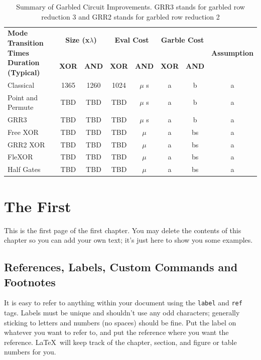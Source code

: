 \documentclass[12pt,twoside]{reedthesis}
\begin{document}
\begin{table}[h]
  \centering
  \renewcommand{\arraystretch}{1.2}
\begin{adjustbox}{width=1\textwidth}
  \begin{tabular}{|p{5cm}||c|c||c|c||c|c||c|}
    \hline
    \multirow{2}{5cm}{\centering \textbf{Mode Transition Times Duration (Typical)}} & 
    \multicolumn{2}{c|}{\textbf{Size (x$\lambda$)}} & 
    \multicolumn{2}{c|}{\textbf{Eval Cost}} & 
    \multicolumn{2}{c|}{\textbf{Garble Cost}} &
    \multirow{2}{3cm}{\centering \textbf{Assumption}} \\
    \cline{2-7}
    & \textbf{XOR} & \textbf{AND} & \textbf{XOR} & \textbf{AND}  & \textbf{XOR} & \textbf{AND} & \\
    \hline
    Classical & 1365 & 1260 & 1024 & $\mu$ s & a & b & a\\ \hline
    Point and Permute & TBD & TBD & TBD & $\mu$ s & a & b & a\\ \hline
    GRR3 & TBD & TBD & TBD & $\mu$ s  & a & b& a\\ \hline
    Free XOR & TBD & TBD & TBD & $\mu$ & a & bs& a  \\ \hline
    GRR2 XOR & TBD & TBD & TBD & $\mu$ & a & bs  & a\\ \hline
    FleXOR& TBD & TBD & TBD & $\mu$ & a & bs & a \\ \hline
    Half Gates & TBD & TBD & TBD & $\mu$ & a & bs & a \\ \hline
  \end{tabular}
  \end{adjustbox}
  \caption{Summary of Garbled Circuit Improvements. GRR3 stands for garbled row reduction 3 and GRR2 stands for garbled row reduction 2}
\end{table}


    \chapter{The First}
    	This is the first page of the first chapter. You may delete the contents of this chapter so you can add your own text; it's just here to show you some examples. 
	
\section{References, Labels, Custom Commands and Footnotes}
It is easy to refer to anything within your document using the \texttt{label} and \texttt{ref} tags.  Labels must be unique and shouldn't use any odd characters; generally sticking to letters and numbers (no spaces) should be fine. Put the label on whatever you want to refer to, and put the reference where you want the reference. \LaTeX\ will keep track of the chapter, section, and figure or table numbers for you. 
\end{document}
